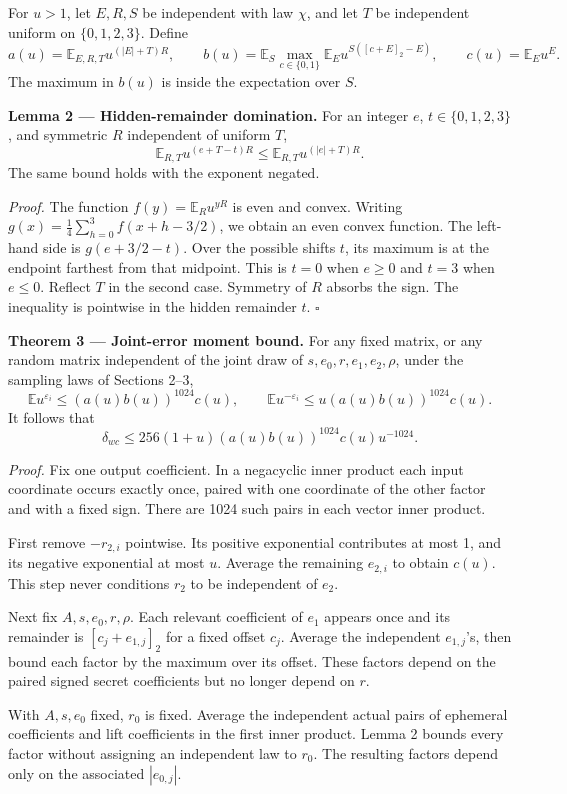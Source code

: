 \documentclass[
  10pt,
  a4paper,
]{article}
\begin{document}
For \(u>1\), let \(E,R,S\) be independent with law \(\chi\), and let
\(T\) be independent uniform on \(\{0,1,2,3\}\). Define \[
a(u)=\mathbb E_{E,R,T}u^{(|E|+T)R},\qquad
b(u)=\mathbb E_S\max_{c\in\{0,1\}}\mathbb E_Eu^{S([c+E]_2-E)},\qquad
c(u)=\mathbb E_Eu^E.
\] The maximum in \(b(u)\) is inside the expectation over \(S\).

\textbf{Lemma 2 --- Hidden-remainder domination.} For an integer \(e\),
\(t\in\{0,1,2,3\}\), and symmetric \(R\) independent of uniform \(T\),
\[
\mathbb E_{R,T}u^{(e+T-t)R}\le
\mathbb E_{R,T}u^{(|e|+T)R}.
\] The same bound holds with the exponent negated.

\emph{Proof.} The function \(f(y)=\mathbb E_Ru^{yR}\) is even and
convex. Writing \(g(x)=\tfrac14\sum_{h=0}^3 f(x+h-3/2)\), we obtain an
even convex function. The left-hand side is \(g(e+3/2-t)\). Over the
possible shifts \(t\), its maximum is at the endpoint farthest from that
midpoint. This is \(t=0\) when \(e\ge0\) and \(t=3\) when \(e\le0\).
Reflect \(T\) in the second case. Symmetry of \(R\) absorbs the sign.
The inequality is pointwise in the hidden remainder \(t\). \(\square\)

\textbf{Theorem 3 --- Joint-error moment bound.} For any fixed matrix,
or any random matrix independent of the joint draw of
\(s,e_0,r,e_1,e_2,\rho\), under the sampling laws of Sections 2--3, \[
\mathbb E u^{\varepsilon_i}\le(a(u)b(u))^{1024}c(u),\qquad
\mathbb E u^{-\varepsilon_i}\le u(a(u)b(u))^{1024}c(u).
\] It follows that \[
\delta_{wc}\le256(1+u)(a(u)b(u))^{1024}c(u)u^{-1024}.
\]

\emph{Proof.} Fix one output coefficient. In a negacyclic inner product
each input coordinate occurs exactly once, paired with one coordinate of
the other factor and with a fixed sign. There are 1024 such pairs in
each vector inner product.

First remove \(-r_{2,i}\) pointwise. Its positive exponential
contributes at most 1, and its negative exponential at most \(u\).
Average the remaining \(e_{2,i}\) to obtain \(c(u)\). This step never
conditions \(r_2\) to be independent of \(e_2\).

Next fix \(A,s,e_0,r,\rho\). Each relevant coefficient of \(e_1\)
appears once and its remainder is \([c_j+e_{1,j}]_2\) for a fixed offset
\(c_j\). Average the independent \(e_{1,j}\)'s, then bound each factor
by the maximum over its offset. These factors depend on the paired
signed secret coefficients but no longer depend on \(r\).

With \(A,s,e_0\) fixed, \(r_0\) is fixed. Average the independent actual
pairs of ephemeral coefficients and lift coefficients in the first inner
product. Lemma 2 bounds every factor without assigning an independent
law to \(r_0\). The resulting factors depend only on the associated
\(|e_{0,j}|\).
\end{document}
